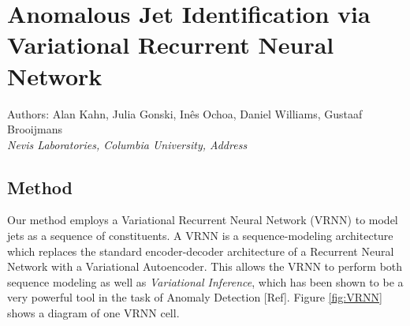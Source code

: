\documentclass[letterpaper,11pt]{article}
\begin{document}
\section*{Anomalous Jet Identification via Variational Recurrent Neural Network}
Authors: Alan Kahn, Julia Gonski, In\^{e}s Ochoa, Daniel Williams, Gustaaf Brooijmans \\ \textit{Nevis Laboratories, Columbia University, Address}\\


\subsection{Method}
\label{sec:method}

Our method employs a Variational Recurrent Neural Network (VRNN) to model jets as a sequence of constituents. A VRNN is a sequence-modeling architecture which replaces the standard encoder-decoder architecture of a Recurrent Neural Network with a Variational Autoencoder. This allows the VRNN to perform both sequence modeling as well as \textit{Variational Inference}, which has been shown to be a very powerful tool in the task of Anomaly Detection [Ref]. Figure \ref{fig:VRNN} shows a diagram of one VRNN cell. 
\end{document}

